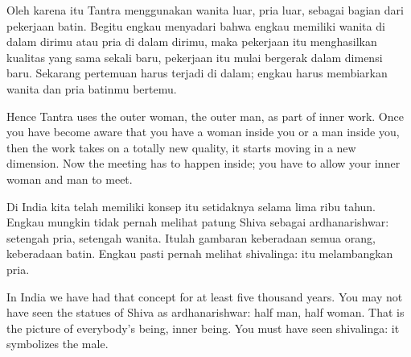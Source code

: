 \bahasa
Oleh karena itu Tantra menggunakan wanita luar, pria luar, sebagai bagian dari pekerjaan batin. Begitu engkau menyadari bahwa engkau memiliki wanita di dalam dirimu atau pria di dalam dirimu, maka pekerjaan itu menghasilkan kualitas yang sama sekali baru, pekerjaan itu mulai bergerak dalam dimensi baru. Sekarang pertemuan harus terjadi di dalam; engkau harus membiarkan wanita dan pria batinmu bertemu.

\english
Hence Tantra uses the outer woman, the outer man, as part of inner work. Once you have become aware that you have a woman inside you or a man inside you, then the work takes on a totally new quality, it starts moving in a new dimension. Now the meeting has to happen inside; you have to allow your inner woman and man to meet.

\bahasa
Di India kita telah memiliki konsep itu setidaknya selama lima ribu tahun. Engkau mungkin tidak pernah melihat patung Shiva sebagai ardhanarishwar: setengah pria, setengah wanita. Itulah gambaran keberadaan semua orang, keberadaan batin. Engkau pasti pernah melihat shivalinga: itu melambangkan pria.

\english
In India we have had that concept for at least five thousand years. You may not have seen the statues of Shiva as ardhanarishwar: half man, half woman. That is the picture of everybody's being, inner being. You must have seen shivalinga: it symbolizes the male.

\bahasa


